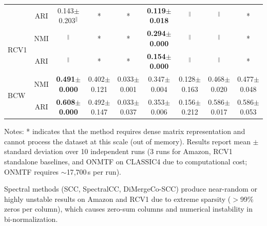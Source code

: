 \documentclass[journal]{IEEEtran}
\theoremstyle{definition}
\theoremstyle{remark} %
\begin{document}
{\begin{table}[htbp]
\begin{threeparttable}
\begin{tabular}{@{} l c ccccccc @{}}
                                        & ARI                     & 0.143$\pm$0.203$^{\|}$                          & *                                             & *                                               & \textbf{0.119$\pm$0.018}                 & $^{\|}$                      & $^{\|}$                         & *                               \\
            \multirow{2}{*}{RCV1}       & NMI                     & $^{\|}$                                         & *                                             & *                                               & \textbf{0.294$\pm$0.000}                 & $^{\|}$                      & $^{\|}$                         & *                               \\
                                        & ARI                     & $^{\|}$                                         & *                                             & *                                               & \textbf{0.154$\pm$0.000}                 & $^{\|}$                      & $^{\|}$                         & *                               \\
            \multirow{2}{*}{BCW}        & NMI                     & \textbf{0.491$\pm$0.000}                        & 0.402$\pm$0.121                               & 0.033$\pm$0.001                                 & 0.347$\pm$0.004                          & 0.128$\pm$0.163              & 0.468$\pm$0.020                 & 0.477$\pm$0.048                 \\
                                        & ARI                     & \textbf{0.608$\pm$0.000}                        & 0.492$\pm$0.147                               & 0.033$\pm$0.037                                 & 0.353$\pm$0.006                          & 0.156$\pm$0.212              & 0.586$\pm$0.017                 & 0.586$\pm$0.053                 \\
            \bottomrule
        \end{tabular}
        \begin{tablenotes}
            \small
            \item Notes: * indicates that the method requires dense matrix representation and cannot process the dataset at this scale (out of memory).
            Results report mean $\pm$ standard deviation over 10 independent runs (3 runs for Amazon, RCV1 standalone baselines, and ONMTF on CLASSIC4 due to computational cost; ONMTF requires ${\sim}$17{,}700\,s per run).
            \item[$\|$] Spectral methods (SCC, SpectralCC, DiMergeCo-SCC) produce near-random or highly unstable results on Amazon and RCV1 due to extreme sparsity ($>$99\% zeros per column), which causes zero-sum columns and numerical instability in bi-normalization.

\end{tablenotes}
\end{threeparttable}
\end{table}}
\end{document}
